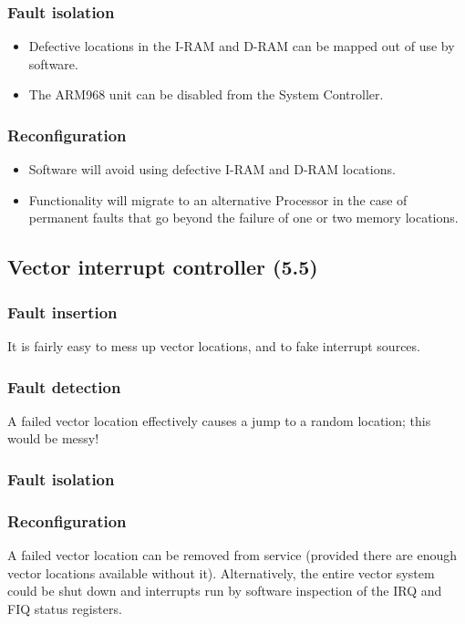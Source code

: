 \documentclass[11pt]{article}
\newenvironment{itmz}{
	\begin{itemize}
		\setlength{\itemsep}{0pt}
		\setlength{\parskip}{0pt}
	}{\end{itemize}}
\begin{document}
\subsubsection*{Fault isolation}
\begin{itmz}
\item Defective locations in the I-RAM and D-RAM can be mapped out of use by software.
\item The ARM968 unit can be disabled from the System Controller.
\end{itmz}
\subsubsection*{Reconfiguration}
\begin{itmz}
\item Software will avoid using defective I-RAM and D-RAM locations.
\item Functionality will migrate to an alternative Processor in the case of permanent faults that go
beyond the failure of one or two memory locations.
\end{itmz}

\subsection{Vector interrupt controller (5.5)}
\subsubsection*{Fault insertion}
It is fairly easy to mess up vector locations, and to fake interrupt sources.
\subsubsection*{Fault detection}
A failed vector location effectively causes a jump to a random location; this would be messy!
\subsubsection*{Fault isolation}
\subsubsection*{Reconfiguration}
A failed vector location can be removed from service (provided there are enough vector locations
available without it). Alternatively, the entire vector system could be shut down and interrupts run
by software inspection of the IRQ and FIQ status registers.
\end{document}
